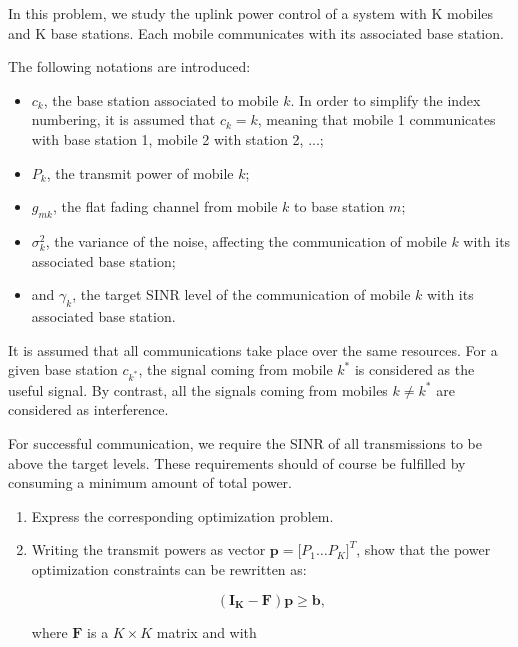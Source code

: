 \documentclass [a4paper, 11pt] {article}
\begin{document}
    \begin{exercise}{2}
    
         In this problem, we study the uplink power control of a system with K mobiles and K base stations. Each mobile communicates with its associated base station. 

The following notations are introduced: 
\begin{itemize}
    \item $c_k$, the base station associated to mobile $k$. In order to simplify the index numbering, it is assumed that $c_k = k$, meaning that mobile 1 communicates with base station 1, mobile 2 with station 2, ...;
    \item $P_k$, the transmit power of mobile $k$;
    \item $g_{mk}$, the flat fading channel from mobile $k$ to base station $m$;
    \item $\sigma_k^2$, the variance of the noise, affecting the communication of mobile $k$ with its associated base station;
    \item and $\gamma_k$, the target SINR level of the communication of mobile $k$ with its associated base station.
\end{itemize}

It is assumed that all communications take place over the same resources. For a given base station $c_{k^*}$, the signal coming from mobile $k^*$ is considered as the useful signal. By contrast, all the signals coming from mobiles $k\neq k^*$ are considered as interference.


For successful communication, we require the SINR of all transmissions to be above the target levels. These requirements should of course be fulfilled by consuming a minimum amount of total power.



\begin{enumerate}

\item Express the corresponding optimization problem.

\item Writing the transmit powers as vector $\mathbf{p} = \big[P_1 \hdots P_K\big]^T$, show that the power optimization constraints can be rewritten as: 

\begin{equation}
(\mathbf{I_K} - \mathbf{F})\mathbf{p} \geq \mathbf{b},
\end{equation}


where $\mathbf{F}$ is a $K \times K$ matrix and with 


\end{enumerate}
\end{exercise}
\end{document}
